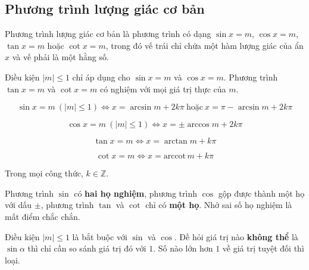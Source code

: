 \documentclass[11pt, a4paper]{article}
\begin{document}
\subsection{Phương trình lượng giác cơ bản}

\begin{dinhnghia}
Phương trình lượng giác cơ bản là phương trình có dạng $\sin x = m$, $\cos x = m$, $\tan x = m$ hoặc $\cot x = m$, trong đó vế trái chỉ chứa một hàm lượng giác của ẩn $x$ và vế phải là một hằng số.

 Điều kiện $|m| \le 1$ chỉ áp dụng cho $\sin x = m$ và $\cos x = m$. Phương trình $\tan x = m$ và $\cot x = m$ có nghiệm với mọi giá trị thực của $m$.
\end{dinhnghia}
\begin{dinhly}
$$\sin x = m \ (|m| \le 1) \iff x = \arcsin m + 2k\pi \ \text{hoặc} \ x = \pi - \arcsin m + 2k\pi$$

$$\cos x = m \ (|m| \le 1) \iff x = \pm\arccos m + 2k\pi$$

$$\tan x = m \iff x = \arctan m + k\pi$$

$$\cot x = m \iff x = \text{arccot}\, m + k\pi$$

Trong mọi công thức, $k \in \mathbb{Z}$.

 Phương trình $\sin$ có \textbf{hai họ nghiệm}, phương trình $\cos$ gộp được thành một họ với dấu $\pm$, phương trình $\tan$ và $\cot$ chỉ có \textbf{một họ}. Nhớ sai số họ nghiệm là mất điểm chắc chắn.

 Điều kiện $|m| \le 1$ là bắt buộc với $\sin$ và $\cos$. Đề hỏi giá trị nào \textbf{không thể} là $\sin\alpha$ thì chỉ cần so sánh giá trị đó với $1$. Số nào lớn hơn $1$ về giá trị tuyệt đối thì loại.
\end{dinhly}
\begin{dinhly}
\end{dinhly}
\end{document}
